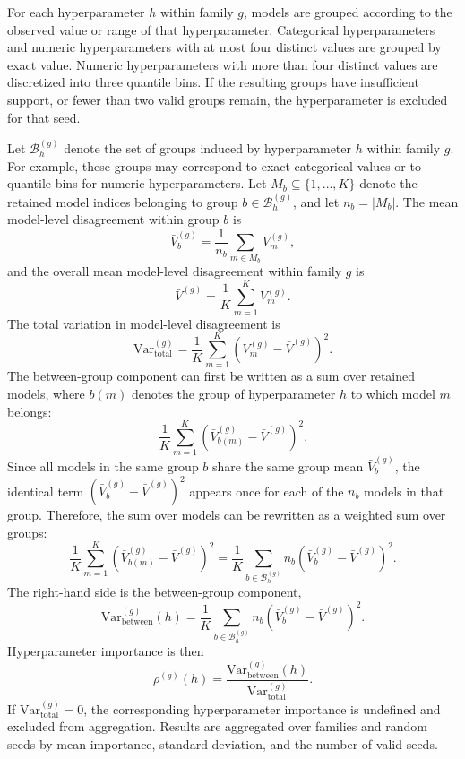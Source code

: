 For each hyperparameter \(h\) within family \(g\), models are grouped according to the
observed value or range of that hyperparameter. Categorical hyperparameters and numeric
hyperparameters with at most four distinct values are grouped by exact value. Numeric
hyperparameters with more than four distinct values are discretized into three quantile
bins. If the resulting groups have insufficient support, or fewer than two valid groups
remain, the hyperparameter is excluded for that seed.

Let \(\mathcal{B}^{(g)}_h\) denote the set of groups induced by hyperparameter
\(h\) within family \(g\). For example, these groups may correspond to exact
categorical values or to quantile bins for numeric hyperparameters. Let
\(M_b \subseteq \{1,\ldots,K\}\) denote the retained model indices belonging to
group \(b \in \mathcal{B}^{(g)}_h\), and let \(n_b = |M_b|\). The mean
model-level disagreement within group \(b\) is
\[
\bar V_b^{(g)}
=
\frac{1}{n_b}
\sum_{m\in M_b}
V_m^{(g)},
\]
and the overall mean model-level disagreement within family \(g\) is
\[
\bar V^{(g)}
=
\frac{1}{K}
\sum_{m=1}^{K}
V_m^{(g)}.
\]
The total variation in model-level disagreement is
\[
\mathrm{Var}^{(g)}_{\mathrm{total}}
=
\frac{1}{K}
\sum_{m=1}^{K}
\left(
V_m^{(g)}-\bar V^{(g)}
\right)^2.
\]
The between-group component can first be written as a sum over retained models,
where \(b(m)\) denotes the group of hyperparameter \(h\) to which model \(m\)
belongs:
\[
\frac{1}{K}
\sum_{m=1}^{K}
\left(
\bar V_{b(m)}^{(g)}-\bar V^{(g)}
\right)^2.
\]
Since all models in the same group \(b\) share the same group mean
\(\bar V_b^{(g)}\), the identical term
\((\bar V_b^{(g)}-\bar V^{(g)})^2\) appears once for each of the \(n_b\)
models in that group. Therefore, the sum over models can be rewritten as a
weighted sum over groups:
\[
\frac{1}{K}
\sum_{m=1}^{K}
\left(
\bar V_{b(m)}^{(g)}-\bar V^{(g)}
\right)^2
=
\frac{1}{K}
\sum_{b\in \mathcal{B}^{(g)}_h}
n_b
\left(
\bar V_b^{(g)}-\bar V^{(g)}
\right)^2.
\]
The right-hand side is the between-group component,
\[
\mathrm{Var}^{(g)}_{\mathrm{between}}(h)
=
\frac{1}{K}
\sum_{b\in \mathcal{B}^{(g)}_h}
n_b
\left(
\bar V_b^{(g)}-\bar V^{(g)}
\right)^2.
\]
Hyperparameter importance is then
\[
\rho^{(g)}(h)
=
\frac{\mathrm{Var}^{(g)}_{\mathrm{between}}(h)}
{\mathrm{Var}^{(g)}_{\mathrm{total}}}.
\]
If \(\mathrm{Var}^{(g)}_{\mathrm{total}}=0\), the corresponding hyperparameter
importance is undefined and excluded from aggregation. Results are aggregated over
families and random seeds by mean importance, standard deviation, and the number of
valid seeds.

